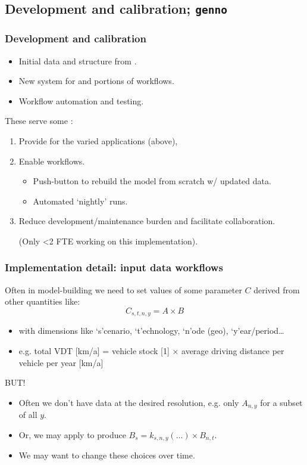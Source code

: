 \documentclass[12pt,aspectratio=169]{beamer}
\begin{document}
\subsection{Development and calibration; \texttt{genno}}
\begin{frame}
\frametitle{Development and calibration}

\begin{itemize}
  \item Initial data and structure from \textcite{mccollum-2017}.
  \item New system for  and  portions of workflows.
  \item Workflow automation and testing.
\end{itemize}

\medskip
These serve some :
\begin{enumerate}
  \item Provide  for the varied applications (above),
  \item Enable  workflows.
  \begin{itemize}
    \item Push-button to rebuild the model from scratch w/ updated data.
    \item Automated ‘nightly’ runs.
  \end{itemize}
  \item Reduce development/maintenance burden and facilitate collaboration.

  (Only <2 FTE working on this implementation).
\end{enumerate}
\end{frame}

\begin{frame}
\frametitle{Implementation detail: input data workflows}

Often in model-building we need to set values of some parameter $C$ derived from other quantities like: $$C_{s,t,n,y} = A \times B$$
\vspace*{-5mm}
\begin{itemize}
  \item with dimensions like ‘s’cenario, ‘t’echnology, ‘n’ode (geo), ‘y’ear/period…
  \item e.g. total VDT [km/a] = vehicle stock [1] × average driving distance per vehicle per year [km/a]
\end{itemize}

BUT! 
\begin{itemize}
  \item Often we don't have data at the desired resolution, e.g. only $A_{n,y}$ for a subset of all $y$.
  \item Or, we may apply  to produce $B_{s} = k_{s,n,y}(…) × B_{n,t}$.
  \item We may want to change these choices over time.
\end{itemize}

\end{frame}
\end{document}
